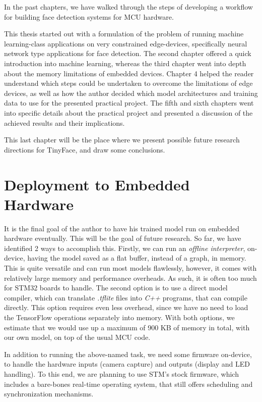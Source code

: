 In the past chapters, we have walked through the steps of developing a workflow for building face detection systems for MCU hardware. \par

This thesis started out with a formulation of the problem of running machine learning-class applications on very constrained edge-devices, specifically neural network type applications for face detection. The second chapter offered a quick introduction into machine learning, whereas the third chapter went into depth about the memory limitations of embedded devices. Chapter 4 helped the reader understand which steps could be undertaken to overcome the limitations of edge devices, as well as how the author decided which model architectures and training data to use for the presented practical project. The fifth and sixth chapters went into specific details about the practical project and presented a discussion of the achieved results and their implications. \par
This last chapter will be the place where we present possible future research directions for TinyFace, and draw some conclusions. \par
\section{Deployment to Embedded Hardware}
It is the final goal of the author to have his trained model run on embedded hardware eventually. This will be the goal of future research. So far, we have identified 2 ways to accomplish this. Firstly, we can run an \textit{offline interpreter}, on-device, having the model saved as a flat buffer, instead of a graph, in memory. This is quite versatile and can run most models flawlessly, however, it comes with relatively large memory and performance overheads. As such, it is often too much for STM32 boards to handle. The second option is to use a direct model compiler, which can translate \textit{.tflite} files into \textit{C++} programs, that can compile directly. This option requires even less overhead, since we have no need to load the TensorFlow operations separately into memory. With both options, we estimate that we would use up a maximum of 900 KB of memory in total, with our own model, on top of the usual MCU code. \par
In addition to running the above-named task, we need some firmware on-device, to handle the hardware inputs (camera capture) and outputs (display and LED handling). To this end, we are planning to use STM's stock firmware, which includes a bare-bones real-time operating system, that still offers scheduling and synchronization mechanisms.

